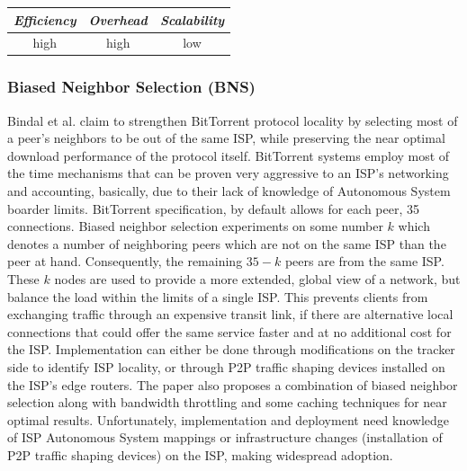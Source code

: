 \begin{center}
\begin{tabular}{ccc}
\emph{Efficiency} & \emph{Overhead} & \emph{Scalability} \\
\hline
high &
high &
low
\end{tabular}
\end{center}

\subsubsection{Biased Neighbor Selection (BNS)}
Bindal et al. \cite{BCCMSBZ2006} claim to strengthen BitTorrent
protocol\cite{c_bittorrent_2003} locality by selecting most of a peer's
neighbors to be out of the same ISP, while preserving the near optimal download
performance of the protocol itself. BitTorrent systems employ most of the time
mechanisms that can be proven very aggressive to an ISP's networking and
accounting, basically, due to their lack of knowledge of Autonomous System
boarder limits. BitTorrent specification, by default allows for each peer, 35
connections. Biased neighbor selection experiments on some number $k$ which
denotes a number of neighboring peers which are not on the same ISP than the
peer at hand. Consequently, the remaining $35 - k$ peers are from the same ISP.
These $k$ nodes are used to provide a more extended, global view of a
network, but balance the load within the limits of a single ISP.
This prevents clients from exchanging traffic through an expensive transit link,
if there are alternative local connections that could offer the same service faster and
at no additional cost for the ISP. Implementation can either be done through
modifications on the tracker side to identify ISP locality, or through P2P
traffic shaping devices installed on the ISP's edge routers. The paper also proposes
a combination of biased neighbor selection along with bandwidth throttling and
some caching techniques for near optimal results. Unfortunately, implementation
and deployment
need knowledge of ISP Autonomous System mappings
or infrastructure changes (installation of P2P traffic shaping devices) on the
ISP, making widespread adoption.

